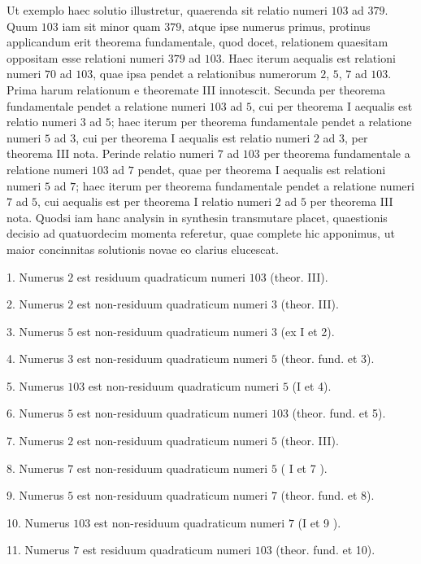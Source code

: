 \documentclass[twoside,12pt, showframe]{memoir}
\begin{document}
Ut exemplo haec solutio illustretur, quaerenda sit relatio numeri \(103\) ad \(379\). Quum \(103\) iam sit minor quam \(379\), atque ipse numerus primus, protinus applicandum erit theorema fundamentale, quod docet, relationem quaesitam oppositam esse relationi numeri \(379\) ad \(103\). Haec iterum aequalis est relationi numeri \(70\) ad \(103\), quae ipsa pendet a relationibus numerorum \(2\), \(5\), \(7\) ad \(103\). Prima harum relationum e theoremate III innotescit. Secunda per theorema fundamentale pendet a relatione numeri \(103\) ad \(5\), cui per theorema I aequalis est relatio numeri \(3\) ad \(5\); haec iterum per theorema fundamentale pendet a relatione numeri \(5\) ad \(3\), cui per theorema I aequalis est relatio numeri \(2\) ad \(3\), per theorema III nota. Perinde relatio numeri \(7\) ad \(103\) per theorema fundamentale a relatione numeri \(103\) ad \(7\) pendet, quae per theorema I aequalis est relationi numeri \(5\) ad \(7\); haec iterum per theorema fundamentale pendet a relatione numeri \(7\) ad \(5\), cui aequalis est per theorema I relatio numeri \(2\) ad \(5\) per theorema III nota. Quodsi iam hanc analysin in synthesin transmutare placet, quaestionis decisio ad quatuordecim momenta referetur, quae complete hic apponimus, ut maior concinnitas solutionis novae eo clarius elucescat.

1. Numerus \(2\) est residuum quadraticum numeri \(103\) (theor. III).
 
2. Numerus \(2\) est non-residuum quadraticum numeri \(3\) (theor. III).
 
3. Numerus \(5\) est non-residuum quadraticum numeri \(3\) (ex I et 2).
 
4. Numerus \(3\) est non-residuum quadraticum numeri \(5\) (theor. fund. et 3).
 
5. Numerus \(103\) est non-residuum quadraticum numeri \(5\) (I et 4).\clearpage\noindent%
 
6. Numerus \(5\) est non-residuum quadraticum numeri \(103\) (theor. fund. et 5).
 
7. Numerus \(2\) est non-residuum quadraticum numeri \(5\) (theor. III).
 
8. Numerus \(7\) est non-residuum quadraticum numeri \(5\) ( I et 7 ).
 
9. Numerus \(5\) est non-residuum quadraticum numeri \(7\) (theor. fund. et 8).
 
10. Numerus \(103\) est non-residuum quadraticum numeri \(7\) (I et 9 ).
 
11. Numerus \(7\) est residuum quadraticum numeri \(103\) (theor. fund. et 10).
 
\end{document}
